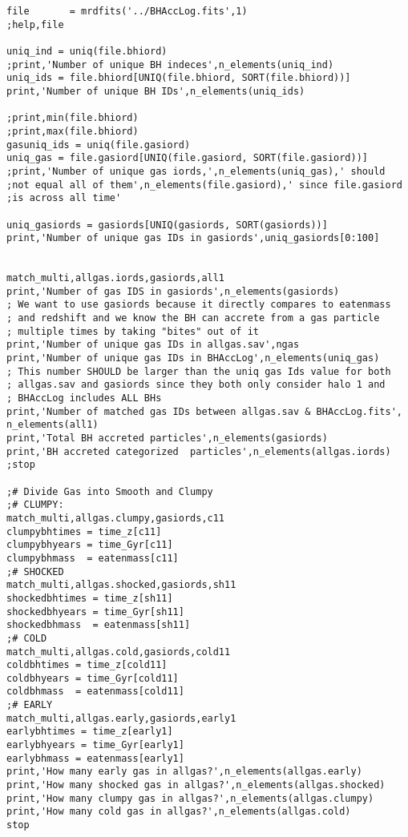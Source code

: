 \documentclass[12pt,headA,chapB]{fiskthesis}
\begin{document}
\begin{verbatim}
file       = mrdfits('../BHAccLog.fits',1)
;help,file

uniq_ind = uniq(file.bhiord)
;print,'Number of unique BH indeces',n_elements(uniq_ind)
uniq_ids = file.bhiord[UNIQ(file.bhiord, SORT(file.bhiord))]
print,'Number of unique BH IDs',n_elements(uniq_ids)

;print,min(file.bhiord)
;print,max(file.bhiord)
gasuniq_ids = uniq(file.gasiord)
uniq_gas = file.gasiord[UNIQ(file.gasiord, SORT(file.gasiord))]
;print,'Number of unique gas iords,',n_elements(uniq_gas),' should 
;not equal all of them',n_elements(file.gasiord),' since file.gasiord
;is across all time'

uniq_gasiords = gasiords[UNIQ(gasiords, SORT(gasiords))]
print,'Number of unique gas IDs in gasiords',uniq_gasiords[0:100]


match_multi,allgas.iords,gasiords,all1
print,'Number of gas IDS in gasiords',n_elements(gasiords)
; We want to use gasiords because it directly compares to eatenmass
; and redshift and we know the BH can accrete from a gas particle
; multiple times by taking "bites" out of it
print,'Number of unique gas IDs in allgas.sav',ngas
print,'Number of unique gas IDs in BHAccLog',n_elements(uniq_gas)
; This number SHOULD be larger than the uniq gas Ids value for both
; allgas.sav and gasiords since they both only consider halo 1 and
; BHAccLog includes ALL BHs
print,'Number of matched gas IDs between allgas.sav & BHAccLog.fits',
n_elements(all1)
print,'Total BH accreted particles',n_elements(gasiords)
print,'BH accreted categorized  particles',n_elements(allgas.iords)
;stop

;# Divide Gas into Smooth and Clumpy
;# CLUMPY:
match_multi,allgas.clumpy,gasiords,c11
clumpybhtimes = time_z[c11]
clumpybhyears = time_Gyr[c11]
clumpybhmass  = eatenmass[c11]
;# SHOCKED
match_multi,allgas.shocked,gasiords,sh11
shockedbhtimes = time_z[sh11]
shockedbhyears = time_Gyr[sh11]
shockedbhmass  = eatenmass[sh11]
;# COLD
match_multi,allgas.cold,gasiords,cold11
coldbhtimes = time_z[cold11]
coldbhyears = time_Gyr[cold11]
coldbhmass  = eatenmass[cold11]
;# EARLY
match_multi,allgas.early,gasiords,early1
earlybhtimes = time_z[early1]
earlybhyears = time_Gyr[early1]
earlybhmass = eatenmass[early1]
print,'How many early gas in allgas?',n_elements(allgas.early)
print,'How many shocked gas in allgas?',n_elements(allgas.shocked)
print,'How many clumpy gas in allgas?',n_elements(allgas.clumpy)
print,'How many cold gas in allgas?',n_elements(allgas.cold)
stop


\end{verbatim}
\end{document}
